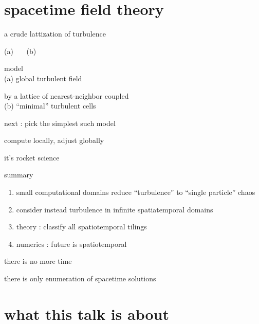 \section[spacetime field theory]
 {spacetime field theory}
\label{spacetimeFT}

\begin{frame}{a crude lattization of turbulence}
\begin{center}
(a) %
~~~(b) %
\end{center}
model \\
(a) global turbulent field

\medskip

by a lattice of nearest-neighbor coupled \\
(b) ``minimal'' turbulent cells

\bigskip

next : \hfill pick the simplest such model
\end{frame}


\begin{frame}{compute locally, adjust globally}

\vfill\hfill
it's rocket science
\end{frame}

\begin{frame}{summary}
\begin{enumerate}
              \item
small computational domains reduce ``turbulence'' to ``single particle'' chaos
              \item
consider instead turbulence in infinite spatiatemporal domains
              \item
theory : classify all spatiotemporal tilings
              \item
numerics : future is spatiotemporal
\end{enumerate}

\vfill

there is no more time

\medskip

there is only enumeration of spacetime solutions
\end{frame}

\section[what this talk is about]
 {what this talk is about}

